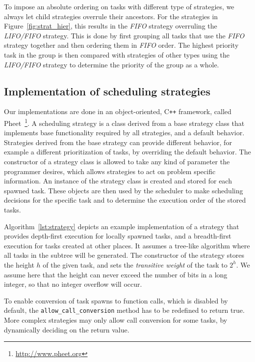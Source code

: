 \documentclass[a4paper,11pt]{article}
\begin{document}
To impose an absolute ordering on tasks with different type of
strategies, we always let child strategies overrule their
ancestors. For the strategies in Figure~\ref{fig:strat_hier}, this
results in the \emph{FIFO} strategy overruling the \emph{LIFO/FIFO}
strategy. This is done by first grouping all tasks that use the
\emph{FIFO} strategy together and then ordering them in \emph{FIFO}
order. The highest priority task in the group is then compared with
strategies of other types using the \emph{LIFO/FIFO} strategy to
determine the priority of the group as a whole.

\subsection{Implementation of scheduling strategies}

Our implementations are done in an object-oriented, C\verb!++!
framework, called
Pheet~\cite{mtaap13,ppopp13}\footnote{\url{http://www.pheet.org}}. A
scheduling strategy is a class derived from a base strategy class that
implements base functionality required by all strategies, and a
default behavior. Strategies derived from the base strategy can
provide different behavior, for example a different prioritization of
tasks, by overriding the default behavior. The constructor of a
strategy class is allowed to take any kind of parameter the programmer
desires, which allows strategies to act on problem specific
information.  An instance of the strategy class is created and stored
for each spawned task. These objects are then used by the scheduler to
make scheduling decisions for the specific task and to determine the
execution order of the stored tasks.

Algorithm~\ref{lst:strategy} depicts an example implementation of a
strategy that provides depth-first execution for locally spawned
tasks, and a breadth-first execution for tasks created at other
places. It assumes a tree-like algorithm where all tasks in the
subtree will be generated.  The constructor of the strategy stores the
height $h$ of the given task, and sets the \emph{transitive weight} of
the task to $2^h$.  We assume here that the height can never exceed
the number of bits in a long integer, so that no integer overflow will
occur.

To enable conversion of task spawns to function calls, which is
disabled by default, the \texttt{allow\_call\_conversion} method has
to be redefined to return true. More complex strategies may only allow
call conversion for some tasks, by dynamically deciding on the return
value.
\end{document}
